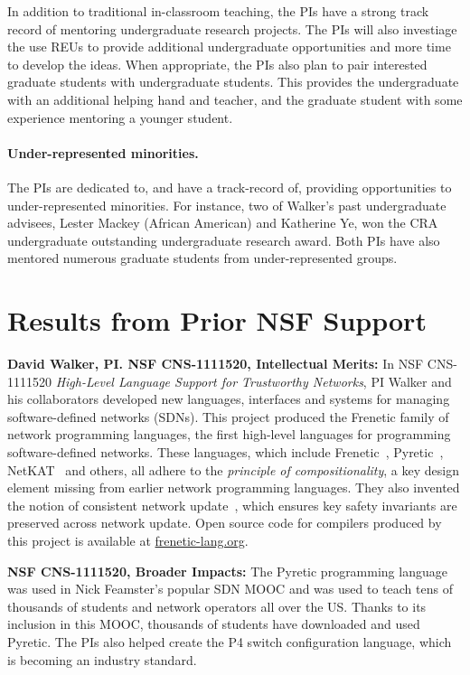 In addition to traditional in-classroom teaching, the PIs have a strong 
track record of mentoring
undergraduate research projects.
The PIs will also
investiage the use REUs to provide additional undergraduate opportunities
and more time to develop the ideas.
When appropriate, 
the PIs also plan to pair interested graduate students with undergraduate 
students.  This provides the undergraduate with
an additional helping hand and teacher, and the graduate student with
some experience mentoring a younger student.  

\paragraph*{Under-represented minorities.} The PIs are dedicated
to, and have a track-record of, providing opportunities to under-represented 
minorities.  For instance, two of Walker's past undergraduate advisees,
Lester Mackey (African American) and Katherine Ye, won the CRA undergraduate 
outstanding undergraduate
research award.  Both PIs have also mentored numerous graduate students from 
under-represented groups.

\section{Results from Prior NSF Support}
\label{sec:prior-support}

\noindent
{\bf David Walker, PI. NSF CNS-1111520, Intellectual Merits:}
In NSF CNS-1111520 \emph{High-Level Language Support for Trustworthy Networks},
PI Walker and his collaborators developed new languages, interfaces
and systems for managing software-defined networks (SDNs).  
This project produced the Frenetic family
of network programming languages, the first high-level languages for
programming software-defined networks.  These languages, which include
Frenetic~\cite{frenetic}, 
Pyretic~\cite{pyretic},
NetKAT~\cite{netkat} and others, all adhere to the
\emph{principle of compositionality}, a key design element missing
from earlier network programming languages.  They also invented the
notion of consistent network update~\cite{reitblatt+:consistent-updates},
which ensures key safety invariants are preserved across network update.
Open source code for compilers produced by this project is available
at \url{frenetic-lang.org}.

\noindent
{\bf NSF CNS-1111520, Broader Impacts:} 
The Pyretic programming language was used in Nick Feamster's popular
SDN MOOC and was used to teach tens of thousands of students and
network operators all over the US.  Thanks to its inclusion in this
MOOC, thousands of students have downloaded and used Pyretic.  The PIs
also helped create the P4 switch configuration language, which is
becoming an industry standard.





 




